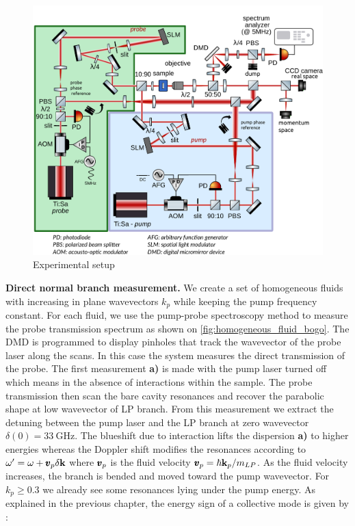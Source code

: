 \begin{figure}[p]
    \centering
    \includegraphics[width=1\textwidth]{chap_custom_st/fig/set_up_spacetime.pdf}
    \caption{Experimental setup}
    \label{fig:setup}
\end{figure}
\clearpage



\bigskip

\textbf{Direct normal branch measurement.} We create a set of homogeneous fluids with increasing in plane wavevectors $k_p$ while keeping the pump frequency constant. 
For each fluid, we use the pump-probe spectroscopy method to measure the probe transmission spectrum as shown on \autoref{fig:homogeneous_fluid_bogo}. 
The DMD is programmed to display pinholes that track the wavevector of the probe laser along the scans. In this case the system measures the direct transmission of the probe. The first measurement \textbf{a)} is made with the pump laser turned off which means in the absence of interactions within the sample.
The probe transmission then scan the bare cavity resonances and recover the parabolic shape at low wavevector of LP branch. From this measurement we extract the detuning between the pump laser and the LP branch at zero wavevector
 $\delta(0) = \SI{33}{\giga\hertz}$. 
 The blueshift due to interaction lifts the dispersion \textbf{a)} to higher energies whereas the Doppler shift modifies the resonances according to 
 $\omega' = \omega + \pmb{v}_p\delta \mathbf{k}$ where $\pmb{v}_p$ is the fluid velocity $\pmb{v}_p = \hbar \mathbf{k}_p/m_{LP}$.  As the fluid velocity increases, the branch is bended and moved toward the pump wavevector. 
 For $k_p\geq 0.3$ we already see some resonances lying under the pump energy. As explained in the previous chapter, the energy sign of a collective mode is given by :
 
